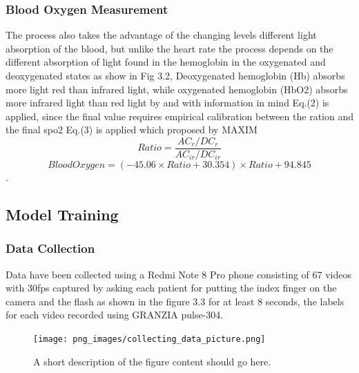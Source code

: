 \documentclass{bmcart}
\begin{document}
\subsubsection*{Blood Oxygen Measurement}
The process also takes the advantage of  the changing levels different light
absorption of the blood, but unlike the heart rate the process depends on the
different absorption of light found in the hemoglobin in the oxygenated and
deoxygenated states as show in Fig 3.2, Deoxygenated hemoglobin (Hb) absorbs
more light red than infrared light, while oxygenated hemoglobin (HbO2) absorbs
more infrared light than red light by and with information in mind Eq.(2) is
applied, since the final value requires empirical calibration between the ration
and the final spo2 Eq.(3) is applied which proposed by MAXIM%
%
\[
 Ratio = \frac{AC_r/DC_r}{AC_{ir}/DC_{ir}}
 \tag{2}
\]
\[
 Blood Oxygen = (-45.06 \times Ratio + 30.354) \times Ratio + 94.845
 \tag{3}
\]
%
\cite{koon,khar,zvai,xjon,marg}.

\subsection*{Model Training}
\subsubsection*{Data Collection}
Data have been collected using a Redmi Note 8 Pro phone consisting of 67 videos
with 30fps captured by asking each patient for putting the index finger on the
camera and the flash as shown in the figure 3.3 for at least 8 seconds, the
labels for each video recorded using GRANZIA pulse-304.
\begin{figure}[h!]
  \texttt{[image: png\_images/collecting\_data\_picture.png]}
  \caption{
      A short description of the figure content should go here.}
\end{figure}
\FloatBarrier
\end{document}
